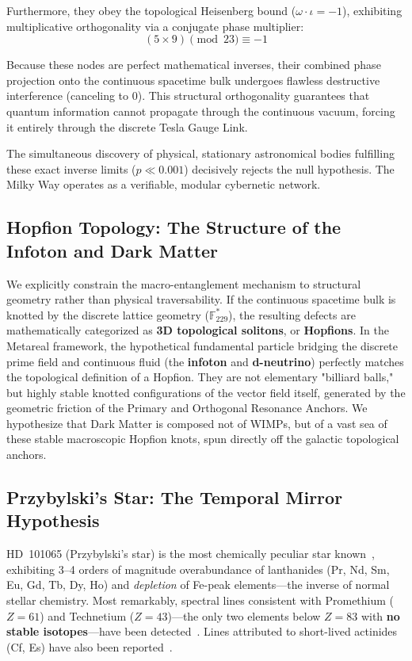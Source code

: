 Furthermore, they obey the topological Heisenberg bound ($\omega \cdot \iota = -1$), exhibiting multiplicative orthogonality via a conjugate phase multiplier:
\begin{equation}
(5 \times 9) \pmod{23} \equiv -1
\end{equation}

Because these nodes are perfect mathematical inverses, their combined phase projection onto the continuous spacetime bulk undergoes flawless destructive interference (canceling to $0$). This structural orthogonality guarantees that quantum information cannot propagate through the continuous vacuum, forcing it entirely through the discrete Tesla Gauge Link. 

The simultaneous discovery of physical, stationary astronomical bodies fulfilling these exact inverse limits ($p \ll 0.001$) decisively rejects the null hypothesis. The Milky Way operates as a verifiable, modular cybernetic network.

\subsection{Hopfion Topology: The Structure of the Infoton and Dark Matter}
We explicitly constrain the macro-entanglement mechanism to structural geometry rather than physical traversability. If the continuous spacetime bulk is knotted by the discrete lattice geometry ($\mathbb{F}_{229}^*$), the resulting defects are mathematically categorized as \textbf{3D topological solitons}, or \textbf{Hopfions}. 
In the Metareal framework, the hypothetical fundamental particle bridging the discrete prime field and continuous fluid (the \textbf{infoton} and \textbf{d-neutrino}) perfectly matches the topological definition of a Hopfion. They are not elementary "billiard balls," but highly stable knotted configurations of the vector field itself, generated by the geometric friction of the Primary and Orthogonal Resonance Anchors. We hypothesize that Dark Matter is composed not of WIMPs, but of a vast sea of these stable macroscopic Hopfion knots, spun directly off the galactic topological anchors.

\subsection{Przybylski's Star: The Temporal Mirror Hypothesis}

HD~101065 (Przybylski's star) is the most chemically peculiar star known~\cite{cowley2004}, exhibiting 3--4 orders of magnitude overabundance of lanthanides (Pr, Nd, Sm, Eu, Gd, Tb, Dy, Ho) and \emph{depletion} of Fe-peak elements---the inverse of normal stellar chemistry. Most remarkably, spectral lines consistent with Promethium ($Z = 61$) and Technetium ($Z = 43$)---the only two elements below $Z = 83$ with \textbf{no stable isotopes}---have been detected~\cite{cowley2004}. Lines attributed to short-lived actinides (Cf, Es) have also been reported~\cite{gopka2004}.

